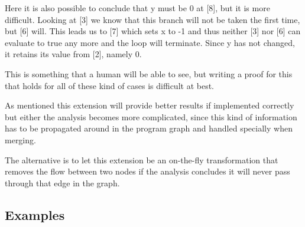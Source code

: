 \docpar
Here it is also possible to conclude that y must be 0 at [8], but it is more
difficult. Looking at [3] we know that this branch will not be
taken the first time, but [6] will. This leads us to [7] which sets x to -1
and thus neither [3] nor [6] can evaluate to true any more and the loop will
terminate. Since y has not changed, it retains its value from [2], namely 0.

  This is something that a human will be able to see, but writing a proof for
this that holds for all of these kind of cases is difficult at best.

\docpar
As mentioned this extension will provide better results if implemented correctly
but either the analysis becomes more complicated, since this kind of information
has to be propagated around in the program graph and handled specially when
merging.

  The alternative is to let this extension be an on-the-fly transformation that
removes the flow between two nodes if the analysis concludes it will never pass
through that edge in the graph.

\subsection{Examples}
